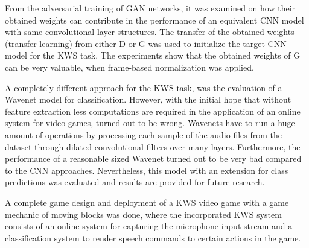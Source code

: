 From the adversarial training of GAN networks, it was examined on how their obtained weights can contribute in the performance of an equivalent CNN model with same convolutional layer structures.
The transfer of the obtained weights (transfer learning) from either D or G was used to initialize the target CNN model for the KWS task.
The experiments show that the obtained weights of G can be very valuable, when frame-based normalization was applied.

A completely different approach for the KWS task, was the evaluation of a Wavenet \cite{Oord2016} model for classification.
However, with the initial hope that without feature extraction less computations are required in the application of an online system for video games, turned out to be wrong.
Wavenets have to run a huge amount of operations by processing each sample of the audio files from the dataset through dilated convolutional filters over many layers.
Furthermore, the performance of a reasonable sized Wavenet turned out to be very bad compared to the CNN approaches.
Nevertheless, this model with an extension for class predictions was evaluated and results are provided for future research.

A complete game design and deployment of a KWS video game with a game mechanic of moving blocks was done, where the incorporated KWS system consists of an online system for capturing the microphone input stream and a classification system to render speech commands to certain actions in the game.